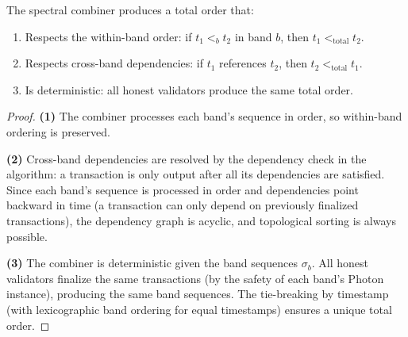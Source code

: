 \begin{theorem}
\label{thm:order}
The spectral combiner produces a total order that:
\begin{enumerate}[nosep]
\item Respects the within-band order: if $t_1 <_b t_2$ in band $b$, then $t_1 <_{\text{total}} t_2$.
\item Respects cross-band dependencies: if $t_1$ references $t_2$, then $t_2 <_{\text{total}} t_1$.
\item Is deterministic: all honest validators produce the same total order.
\end{enumerate}
\end{theorem}

\begin{proof}
\textbf{(1)} The combiner processes each band's sequence in order, so within-band
ordering is preserved.

\textbf{(2)} Cross-band dependencies are resolved by the dependency check in the
algorithm: a transaction is only output after all its dependencies are satisfied.
Since each band's sequence is processed in order and dependencies point backward in
time (a transaction can only depend on previously finalized transactions), the dependency
graph is acyclic, and topological sorting is always possible.

\textbf{(3)} The combiner is deterministic given the band sequences $\sigma_b$.
All honest validators finalize the same transactions (by the safety of each band's
Photon instance), producing the same band sequences. The tie-breaking by timestamp
(with lexicographic band ordering for equal timestamps) ensures a unique total order.
\end{proof}

